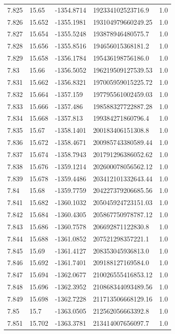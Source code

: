 \begin{tabular}{lllll}
7.825 & 15.65 & -1354.8714 & 192334102523716.9 & 1.0 \\
7.826 & 15.652 & -1355.1981 & 193104979660249.25 & 1.0 \\
7.827 & 15.654 & -1355.5248 & 193878946480575.7 & 1.0 \\
7.828 & 15.656 & -1355.8516 & 194656015368181.2 & 1.0 \\
7.829 & 15.658 & -1356.1784 & 195436198756186.0 & 1.0 \\
7.83 & 15.66 & -1356.5052 & 196219509127539.53 & 1.0 \\
7.831 & 15.662 & -1356.8321 & 197005959015225.72 & 1.0 \\
7.832 & 15.664 & -1357.159 & 197795561002459.03 & 1.0 \\
7.833 & 15.666 & -1357.486 & 198588327722887.28 & 1.0 \\
7.834 & 15.668 & -1357.813 & 199384271860796.4 & 1.0 \\
7.835 & 15.67 & -1358.1401 & 200183406151308.8 & 1.0 \\
7.836 & 15.672 & -1358.4671 & 200985743380589.44 & 1.0 \\
7.837 & 15.674 & -1358.7943 & 201791296386052.62 & 1.0 \\
7.838 & 15.676 & -1359.1214 & 202600078056562.12 & 1.0 \\
7.839 & 15.678 & -1359.4486 & 203412101332643.44 & 1.0 \\
7.84 & 15.68 & -1359.7759 & 204227379206685.56 & 1.0 \\
7.841 & 15.682 & -1360.1032 & 205045924723151.03 & 1.0 \\
7.842 & 15.684 & -1360.4305 & 205867750978787.12 & 1.0 \\
7.843 & 15.686 & -1360.7578 & 206692871122830.8 & 1.0 \\
7.844 & 15.688 & -1361.0852 & 207521298357221.1 & 1.0 \\
7.845 & 15.69 & -1361.4127 & 208353045936813.0 & 1.0 \\
7.846 & 15.692 & -1361.7401 & 209188127169584.0 & 1.0 \\
7.847 & 15.694 & -1362.0677 & 210026555416853.12 & 1.0 \\
7.848 & 15.696 & -1362.3952 & 210868344093489.56 & 1.0 \\
7.849 & 15.698 & -1362.7228 & 211713506668129.16 & 1.0 \\
7.85 & 15.7 & -1363.0505 & 212562056663392.8 & 1.0 \\
7.851 & 15.702 & -1363.3781 & 213414007656097.7 & 1.0 \\

\end{tabular}
